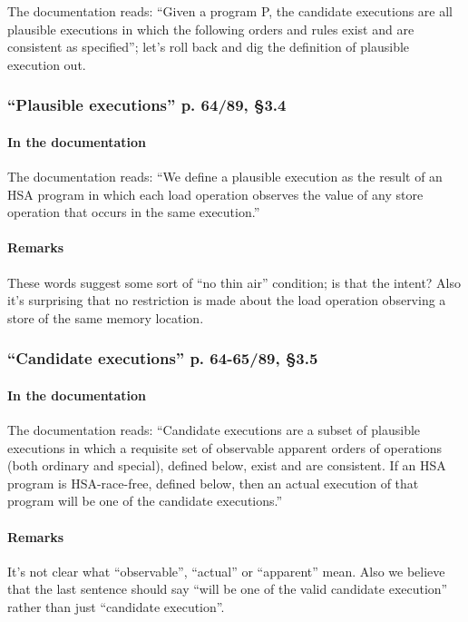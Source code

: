 \documentclass[a4paper]{article}
\begin{document}
The documentation reads: ``Given a program P, the candidate executions are all
plausible executions in which the following orders and rules exist and are
consistent as specified''; let's roll back and dig the definition of plausible
execution out.

\subsubsection{``Plausible executions'' p. 64/89, \S 3.4}

\paragraph{In the documentation}
The documentation reads: ``We define a plausible execution as the result of an
HSA program in which each load operation observes the value of any store
operation that occurs in the same execution.''

\paragraph{Remarks}
These words suggest some sort of ``no thin air'' condition; is that the intent?
Also it's surprising that no restriction is made about the load operation
observing a store of the same memory location.

\subsubsection{``Candidate executions'' p. 64-65/89, \S 3.5}

\paragraph{In the documentation}
The documentation reads: ``Candidate executions are a subset of plausible
executions in which a requisite set of observable apparent orders of operations
(both ordinary and special), defined below, exist and are consistent.  If an
HSA program is HSA-race-free, defined below, then an actual execution of that
program will be one of the candidate executions.'' 

\paragraph{Remarks}
It's not clear what ``observable'', ``actual'' or ``apparent'' mean. Also we
believe that the last sentence should say ``will be one of the valid candidate
execution'' rather than just ``candidate execution''.
\end{document}
